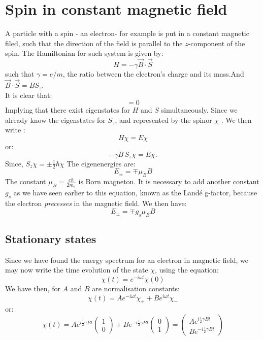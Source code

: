 \section{ Spin in constant magnetic field}
A particle with a spin - an electron- for example is put in a constant magnetic filed, such that the direction of the field is parallel to the $z$-component of the spin. The Hamiltonian for such system is given by:
\begin{equation}
H= -\gamma \vec{B}\cdot \vec S
\end{equation}
such that $ \gamma = e/m$, the  ratio between the electron's charge and its mass.And $ \vec B \cdot \vec S = B S_z$.\\
It is clear that:
\begin{equation}
[ H, S_z] =0
\end{equation}
Implying that there exist  eigenstates for $H$ and $S$ simultaneously. Since we already know the eigenstates for $S_z$,  and represented by the spinor $ \chi$ . We then write :
\begin{equation}
H \chi = E \chi 
\end{equation}
or:
\begin{equation}
- \gamma B \, S_z \chi = E \chi .
\end{equation}
Since, $ S_z \chi = \pm \frac{1}{2} \hbar \chi$	 The eigenenergies are:
\begin{equation}
E_{\pm} = \mp \mu_B B
\end{equation}
The constant $ \mu_B = \frac{e \hbar}{2 m_e}$ is Born magneton. It is necessary to add another constant $g_s$ as we have seen earlier to this equation, known as the Land\'{e} g-factor, because the electron \textit{precesses} in the magnetic field. We then have:
\begin{equation}
E_\pm = \mp g_s \mu_B B
\end{equation}
\subsection{ Stationary states}
Since we have found the energy spectrum for an electron in magnetic field, we may now write the time evolution of the state $ \chi$, using the equation:
\begin{equation}
\chi (t) = e^{-i \omega t} \chi(0)
\end{equation}
We have then, for $A$ and $B$ are normalisation constants:
\begin{equation}
\chi(t) = A e^{-i \omega t} \chi_+ + B e^{i\omega t} \chi_-
\end{equation}
or:
\begin{equation}
\chi (t) = A e^{i \frac{1}{2} \gamma Bt} \begin{pmatrix}
1\\0
\end{pmatrix}
+  B e^{-i \frac{1}{2} \gamma Bt} \begin{pmatrix}
0\\1
\end{pmatrix} = \begin{pmatrix}
A e^{i \frac{1}{2} \gamma Bt} \\ B e^{-i \frac{1}{2} \gamma Bt}
\end{pmatrix}
\end{equation}
